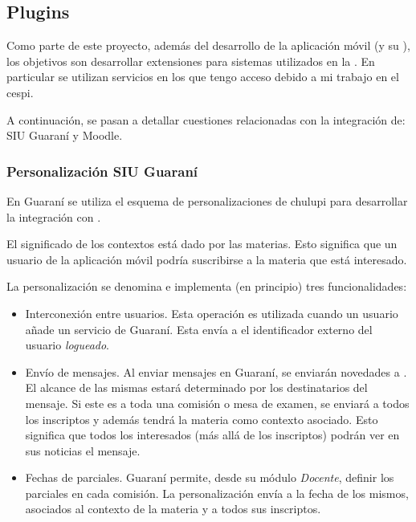 \subsection{Plugins}
\label{desarrollo_plugins}

Como parte de este proyecto, además del desarrollo de la aplicación móvil (y su ), los objetivos son desarrollar extensiones para sistemas utilizados en la \unlp{}. En particular se utilizan servicios en los que tengo acceso debido a mi trabajo en el \gls{cespi}.

A continuación, se pasan a detallar cuestiones relacionadas con la integración de: SIU Guaraní y Moodle.

\subsubsection{Personalización SIU Guaraní}
\label{desarrollo_plugins_guarani}

En Guaraní se utiliza el esquema de personalizaciones de \gls{chulupi} para desarrollar la integración con \nombreApp{}. 

El significado de los contextos está dado por las materias. Esto significa que un usuario de la aplicación móvil podría suscribirse a la materia que está interesado.

La personalización se denomina  e implementa (en principio) tres funcionalidades:
\begin{itemize}
\item Interconexión entre usuarios. Esta operación es utilizada cuando un usuario añade un servicio de Guaraní. Esta envía a \nombreApp{} el identificador externo del usuario \textit{logueado}.
\item Envío de mensajes. Al enviar mensajes en Guaraní, se enviarán novedades a \nombreApp{}. El alcance de las mismas estará determinado por los destinatarios del mensaje. Si este es a toda una comisión o mesa de examen, se enviará a todos los inscriptos y además tendrá la materia como contexto asociado. Esto significa que todos los interesados (más allá de los inscriptos) podrán ver en sus noticias el mensaje.
\item Fechas de parciales. Guaraní permite, desde su módulo \textit{Docente}, definir los parciales en cada comisión. La personalización envía a \nombreApp{} la fecha de los mismos, asociados al contexto de la materia y a todos sus inscriptos. 
\end{itemize}


